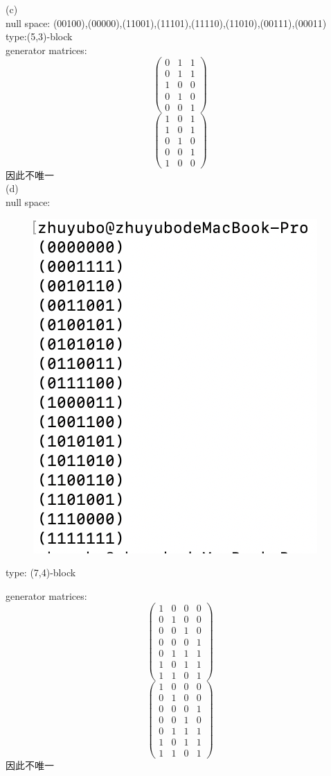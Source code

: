 \documentclass[a4paper, justified]{tufte-handout}
\begin{document}
\begin{solution}
(c)\\
null space: (00100),(00000),(11001),(11101),(11110),(11010),(00111),(00011)\\
type:(5,3)-block\\
generator matrices:\\
 $$\begin{pmatrix}0&1&1\\
			   0&1&1\\
			   1&0&0\\
			   0&1&0\\
			   0&0&1
     \end{pmatrix}$$
      $$\begin{pmatrix}1&0&1\\
			   1&0&1\\
			   0&1&0\\
			   0&0&1\\
			   1&0&0
     \end{pmatrix}$$
因此不唯一\\
(d)\\
null space:
\begin{figure}[htbp]
    \centering
    \includegraphics[width = 0.30\linewidth]{figs/a}
  \end{figure}  
\noindent type: (7,4)-block

generator matrices:\\
 $$\begin{pmatrix}1&0&0&0\\
			   0&1&0&0\\
			   0&0&1&0\\
			   0&0&0&1\\
			   0&1&1&1\\
			   1&0&1&1\\
			   1&1&0&1
     \end{pmatrix}$$
     $$\begin{pmatrix}1&0&0&0\\
			   0&1&0&0\\
			   0&0&0&1\\
			    0&0&1&0\\
			   0&1&1&1\\
			   1&0&1&1\\
			   1&1&0&1
     \end{pmatrix}$$因此不唯一\\
\end{solution}
\end{document}
